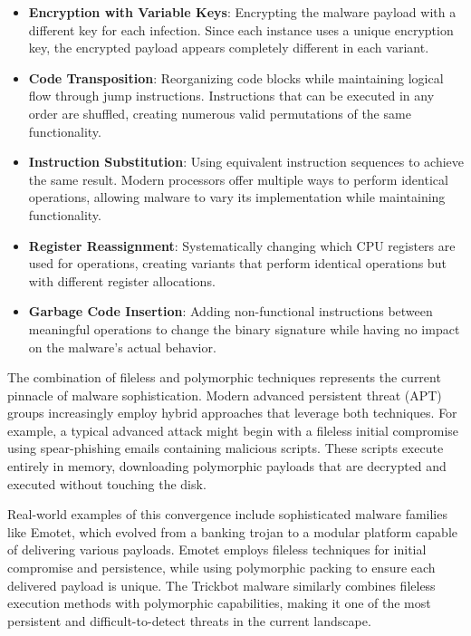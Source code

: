 \begin{itemize}
    \item \textbf{Encryption with Variable Keys}: Encrypting the malware payload with a different key for each infection. Since each instance uses a unique encryption key, the encrypted payload appears completely different in each variant.
    
    \item \textbf{Code Transposition}: Reorganizing code blocks while maintaining logical flow through jump instructions. Instructions that can be executed in any order are shuffled, creating numerous valid permutations of the same functionality.
    
    \item \textbf{Instruction Substitution}: Using equivalent instruction sequences to achieve the same result. Modern processors offer multiple ways to perform identical operations, allowing malware to vary its implementation while maintaining functionality.
    
    \item \textbf{Register Reassignment}: Systematically changing which CPU registers are used for operations, creating variants that perform identical operations but with different register allocations.
    
    \item \textbf{Garbage Code Insertion}: Adding non-functional instructions between meaningful operations to change the binary signature while having no impact on the malware's actual behavior.
\end{itemize}

The combination of fileless and polymorphic techniques represents the current pinnacle of malware sophistication. Modern advanced persistent threat (APT) groups increasingly employ hybrid approaches that leverage both techniques. For example, a typical advanced attack might begin with a fileless initial compromise using spear-phishing emails containing malicious scripts. These scripts execute entirely in memory, downloading polymorphic payloads that are decrypted and executed without touching the disk.

Real-world examples of this convergence include sophisticated malware families like Emotet, which evolved from a banking trojan to a modular platform capable of delivering various payloads. Emotet employs fileless techniques for initial compromise and persistence, while using polymorphic packing to ensure each delivered payload is unique. The Trickbot malware similarly combines fileless execution methods with polymorphic capabilities, making it one of the most persistent and difficult-to-detect threats in the current landscape.

